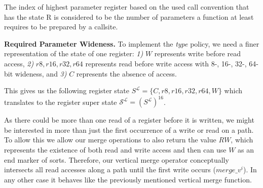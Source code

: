 The index of highest parameter register based on the used call convention that has the state R is considered to be the number of parameters a function at least requires to be prepared by a callsite.

\textbf{Required Parameter Wideness.}
\label{subsection:requiredparamwideness}
To implement the \emph{type} policy, we need a finer representation of the state of one register:
\textit{1)} $W$ represents write before read access,
\textit{2)} $r8, r16, r32, r64$ represents read before write access with 8-, 16-, 32-, 64-bit wideness, and
\textit{3)} $C$ represents the absence of access.

This gives us the following register state $S^\mathcal{L} = \{ C, r8, r16, r32, r64, W \}$ which translates to the register super state 
$\mathcal{S}^\mathcal{L} = (S^\mathcal{L})^{16}$.

As there could be more than one read of a register before it is written, we might be interested in more than just the first occurrence of a write or read on a path. 
To allow this we allow our merge operations to also return the value $RW$, which represents the existence of both read and write access and then can use $W$ as an end 
marker of sorts.
Therefore, our vertical merge operator conceptually intersects all read accesses along a path until the first write 
occurs ($merge\_v^{i}$). In any other case it behaves like the previously mentioned vertical merge function.

